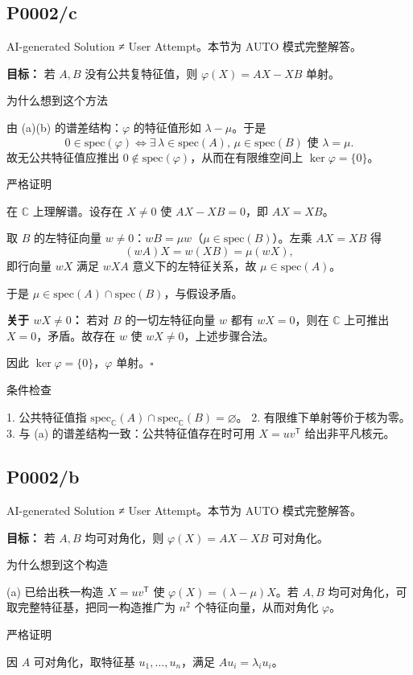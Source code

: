 \documentclass[
    lang=cn,
    color=blue,
    mode=fancy,
    thmcnt=section,
    scheme=chinese
]{elegantbook}
\begin{document}
\subsection{P0002/c}
AI-generated Solution ≠ User Attempt。本节为 AUTO 模式完整解答。

\textbf{目标：} 若 $A,B$ 没有公共复特征值，则 $\varphi(X)=AX-XB$ 单射。

为什么想到这个方法

由 (a)(b) 的谱差结构：$\varphi$ 的特征值形如 $\lambda-\mu$。于是
\[
0\in\mathrm{spec}(\varphi)\iff \exists\,\lambda\in\mathrm{spec}(A),\,\mu\in\mathrm{spec}(B)\text{ 使 }\lambda=\mu.
\]
故无公共特征值应推出 $0\notin\mathrm{spec}(\varphi)$，从而在有限维空间上 $\ker\varphi=\{0\}$。

严格证明

在 $\mathbb{C}$ 上理解谱。设存在 $X\neq 0$ 使 $AX-XB=0$，即 $AX=XB$。

取 $B$ 的左特征向量 $w\neq 0$：$wB=\mu w$（$\mu\in\mathrm{spec}(B)$）。左乘 $AX=XB$ 得
\[
(wA)X = w(XB) = \mu (wX),
\]
即行向量 $wX$ 满足 $wXA$ 意义下的左特征关系，故 $\mu\in\mathrm{spec}(A)$。

于是 $\mu\in\mathrm{spec}(A)\cap\mathrm{spec}(B)$，与假设矛盾。

\textbf{关于 $wX\neq 0$：} 若对 $B$ 的一切左特征向量 $w$ 都有 $wX=0$，则在 $\mathbb{C}$ 上可推出 $X=0$，矛盾。故存在 $w$ 使 $wX\neq 0$，上述步骤合法。

因此 $\ker\varphi=\{0\}$，$\varphi$ 单射。$\square$

条件检查

1. 公共特征值指 $\mathrm{spec}_{\mathbb{C}}(A)\cap\mathrm{spec}_{\mathbb{C}}(B)=\varnothing$。
2. 有限维下单射等价于核为零。
3. 与 (a) 的谱差结构一致：公共特征值存在时可用 $X=uv^{\mathsf T}$ 给出非平凡核元。

\subsection{P0002/b}
AI-generated Solution ≠ User Attempt。本节为 AUTO 模式完整解答。

\textbf{目标：} 若 $A,B$ 均可对角化，则 $\varphi(X)=AX-XB$ 可对角化。

为什么想到这个构造

(a) 已给出秩一构造 $X=uv^{\mathsf T}$ 使 $\varphi(X)=(\lambda-\mu)X$。若 $A,B$ 均可对角化，可取完整特征基，把同一构造推广为 $n^2$ 个特征向量，从而对角化 $\varphi$。

严格证明

因 $A$ 可对角化，取特征基 $u_1,\ldots,u_n$，满足 $Au_i=\lambda_i u_i$。
\end{document}
